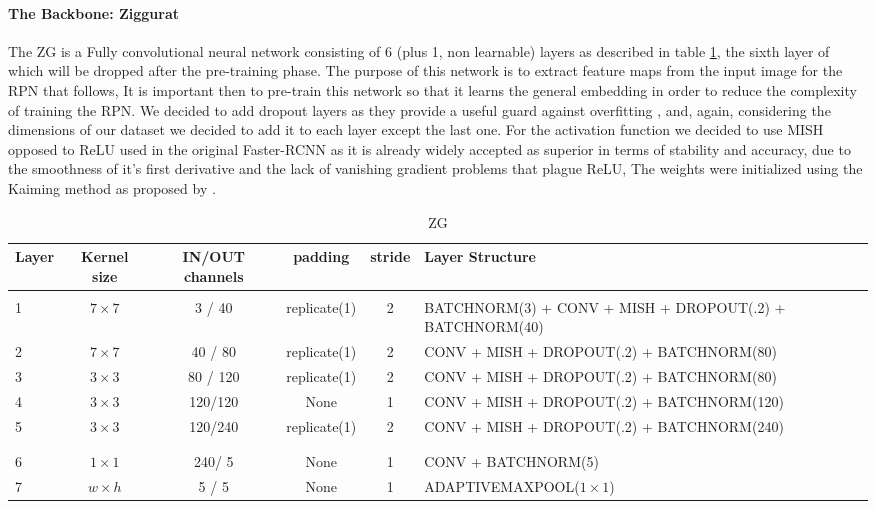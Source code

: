 \documentclass[10pt,journal,cspaper,compsoc]{IEEEtran}
\begin{document}
    \paragraph*{The Backbone: Ziggurat}
    The ZG is a Fully convolutional neural network consisting of 6 (plus 1, non learnable) layers as described in table \ref{tab:Table 1}, the sixth layer of which will be dropped after the pre-training phase. 
    The purpose of this network is to extract feature maps from the input image for the RPN that follows,
    It is important then to pre-train this network so that it learns the general embedding in order 
    to reduce the complexity of training the RPN. 
    We decided to add dropout layers as they provide a useful guard against overfitting \cite{Srivastava:Dropout}, and, again, considering the dimensions of our dataset we decided to add it to each layer except the last one. For the activation function we decided to use MISH opposed to ReLU used in the original Faster-RCNN as it is already 
    widely accepted as superior in terms of stability and accuracy, due to the smoothness of it's first derivative and the lack of vanishing gradient problems that plague ReLU, The weights were initialized using the Kaiming method as proposed by \cite{arxiv:Kaiming}.
    \begin{table}[htb]
        \centering
		\caption{ZG}
		\label{tab:Table 1}
		\begin{tabularx}{.9\paperwidth}{l | c | c | c | c |  l}  
			\textbf{Layer} & \textbf{Kernel size} & \textbf{IN/OUT channels} & \textbf{padding} & \textbf{stride} & \textbf{Layer Structure}\\
			\hline 
			& & & & & \\
			1 & $7\times 7$ & 3 / 40 & replicate(1) & 2 & BATCHNORM(3) + CONV + MISH + DROPOUT(.2) + BATCHNORM(40) \\
			2 & $7\times 7$ & 40 / 80 & replicate(1) & 2 & CONV + MISH + DROPOUT(.2) + BATCHNORM(80) \\
			3 & $3\times 3$ & 80 / 120 & replicate(1) & 2 & CONV + MISH + DROPOUT(.2) + BATCHNORM(80) \\ 
			4 & $3\times 3$ & 120/120 & None & 1 & CONV + MISH + DROPOUT(.2) + BATCHNORM(120)  \\
			5 & $3\times 3$ & 120/240 & replicate(1) & 2 & CONV + MISH + DROPOUT(.2) + BATCHNORM(240) \\
			& & & & & \\
			\hline
			& & & & & \\
			6 & $1\times 1$ & 240/ 5 & None & 1 & CONV + BATCHNORM(5)\\
            7 & $w\times h$ & 5 / 5 & None & 1 & ADAPTIVEMAXPOOL($1 \times 1$)
		\end{tabularx}
    \end{table}
    
\end{document}
